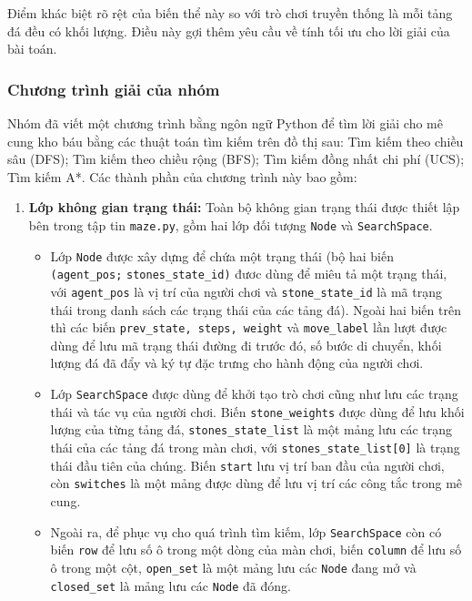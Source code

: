 Điểm khác biệt rõ rệt của biến thể này so với trò chơi truyền thống là mỗi tảng đá đều có khối lượng. Điều này gợi thêm yêu cầu về tính tối ưu cho lời giải của bài toán.

\subsubsection{Chương trình giải của nhóm}
Nhóm đã viết một chương trình bằng ngôn ngữ Python để tìm lời giải cho mê cung kho báu bằng các thuật toán tìm kiếm trên đồ thị sau: Tìm kiếm theo chiều sâu (DFS); Tìm kiếm theo chiều rộng (BFS); Tìm kiếm đồng nhất chi phí (UCS); Tìm kiếm A*. Các thành phần của chương trình này bao gồm:
\begin{enumerate}[label=\bfseries\arabic*), labelindent=2em, labelsep=0.3cm, leftmargin=1cm, wide=\parindent, topsep=0.1cm, itemsep=-1ex, partopsep=1.5ex, parsep=1.5ex]
	\item \textbf{Lớp không gian trạng thái:} Toàn bộ không gian trạng thái được thiết lập bên trong tập tin \verb|maze.py|, gồm hai lớp đối tượng \verb|Node| và \verb|SearchSpace|.
	\begin{itemize}[labelindent=2em, labelsep=0.3cm, leftmargin=1cm, wide=1.5\parindent, topsep=0.1cm, itemsep=-1ex, partopsep=1.5ex, parsep=1.5ex]
		\item Lớp \verb|Node| được xây dựng để chứa một trạng thái (bộ hai biến \verb|(agent_pos;| \verb|stones_state_id)| đươc dùng để miêu tả một trạng thái, với \verb|agent_pos| là vị trí của người chơi và \verb|stone_state_id| là mã trạng thái trong danh sách các trạng thái của các tảng đá). Ngoài hai biến trên thì các biến \verb|prev_state, steps, weight| và \verb|move_label| lần lượt được dùng để lưu mã trạng thái đường đi trước đó, số bước di chuyển, khối lượng đá đã đẩy và ký tự đặc trưng cho hành động của người chơi.
		\item Lớp \verb|SearchSpace| được dùng để khởi tạo trò chơi cũng như lưu các trạng thái và tác vụ của người chơi. Biến \verb|stone_weights| được dùng để lưu khối lượng của từng tảng đá, \verb|stones_state_list| là một mảng lưu các trạng thái của các tảng đá trong màn chơi, với \verb|stones_state_list[0]| là trạng thái đầu tiên của chúng. Biến \verb|start| lưu vị trí ban đầu của người chơi, còn \verb|switches| là một mảng được dùng để lưu vị trí các công tắc trong mê cung.
		\item Ngoài ra, để phục vụ cho quá trình tìm kiếm, lớp \verb|SearchSpace| còn có biến \verb|row| để lưu số ô trong một dòng của màn chơi, biến \verb|column| để lưu số ô trong một cột, \verb|open_set| là một mảng lưu các \verb|Node| đang mở và \verb|closed_set| là mảng lưu các \verb|Node| đã đóng.

\end{itemize}
\end{enumerate}
